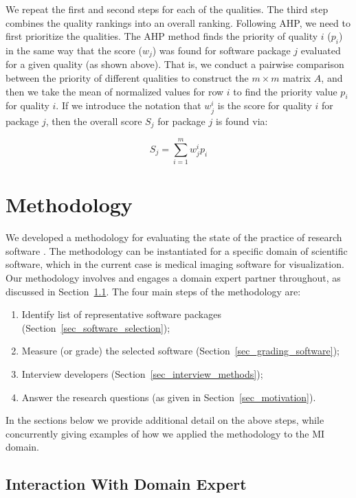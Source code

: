 \documentclass[final, 3p, times, authoryear]{elsarticle}
\begin{document}
We repeat the first and second steps for each of the qualities.  The third step
combines the quality rankings into an overall ranking.  Following AHP, we need
to first prioritize the qualities.  The AHP method finds the priority of quality
$i$ ($p_i$) in the same way that the score ($w_j$) was found for software
package $j$ evaluated for a given quality (as shown above).  That is, we
conduct a pairwise comparison between the priority of different qualities to
construct the $m \times m$ matrix $A$, and then we take the mean of normalized
values for row $i$ to find the priority value $p_i$ for quality $i$.  If we
introduce the notation that $w^i_j$ is the score for quality $i$ for package
$j$, then the overall score $S_j$ for package $j$ is found via:

$$S_j = \sum_{i=1}^m w^i_j p_i$$ 

\section{Methodology} \label{ch_methods}

We developed a methodology for evaluating the state of the practice of research
software \citep{SmithEtAl2021, SmithAndMichalski2022}.  The methodology can be
instantiated for a specific domain of scientific software, which in the current
case is medical imaging software for visualization.  Our methodology involves
and engages a domain expert partner throughout, as discussed in
Section~\ref{sec_vet_software_list}.  The four main steps of the methodology
are:

\begin{enumerate}
\item Identify list of representative software packages
(Section~\ref{sec_software_selection});
\item Measure (or grade) the selected software
(Section~\ref{sec_grading_software});
\item Interview developers (Section~\ref{sec_interview_methods});
\item Answer the research questions (as given in Section~\ref{sec_motivation}).
\end{enumerate}

In the sections below we provide additional detail on the above steps, while
concurrently giving examples of how we applied the methodology to the MI domain.

\subsection{Interaction With Domain Expert} \label{sec_vet_software_list}
\end{document}
